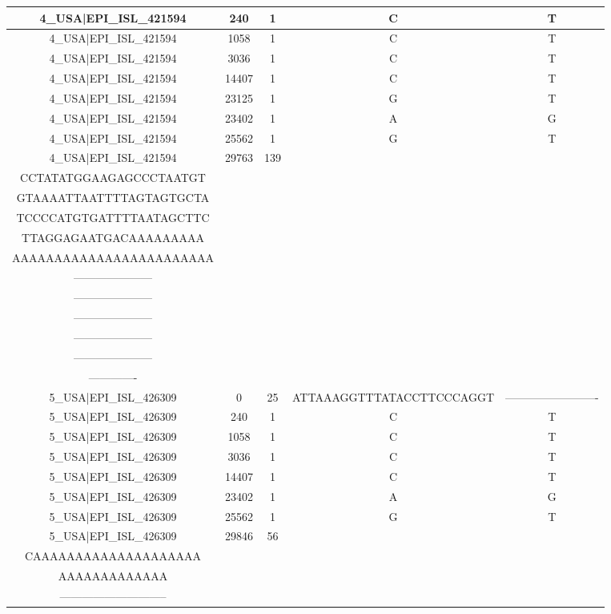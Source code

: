 \documentclass[a4paper,10pt]{article}
\begin{document}
\begin{longtable}{@{}ccccc@{}}
4\_USA|EPI\_ISL\_421594 & 240 & 1 & C & T \\* \midrule
4\_USA|EPI\_ISL\_421594 & 1058 & 1 & C & T \\* \midrule
4\_USA|EPI\_ISL\_421594 & 3036 & 1 & C & T \\* \midrule
4\_USA|EPI\_ISL\_421594 & 14407 & 1 & C & T \\* \midrule
4\_USA|EPI\_ISL\_421594 & 23125 & 1 & G & T \\* \midrule
4\_USA|EPI\_ISL\_421594 & 23402 & 1 & A & G \\* \midrule
4\_USA|EPI\_ISL\_421594 & 25562 & 1 & G & T \\* \midrule
4\_USA|EPI\_ISL\_421594 & 29763 & 139 & \begin{tabular}[c]{@{}c@{}}TGAACAATGCTAGGGAGAGCTG\\ CCTATATGGAAGAGCCCTAATGT\\ GTAAAATTAATTTTAGTAGTGCTA\\ TCCCCATGTGATTTTAATAGCTTC\\ TTAGGAGAATGACAAAAAAAAA\\ AAAAAAAAAAAAAAAAAAAAAAAA\end{tabular} & \begin{tabular}[c]{@{}c@{}}---------------------\\ ---------------------\\ ---------------------\\ ---------------------\\ ---------------------\\ ---------------------\\ -------------\end{tabular} \\* \midrule
5\_USA|EPI\_ISL\_426309 & 0 & 25 & ATTAAAGGTTTATACCTTCCCAGGT & ------------------------- \\* \midrule
5\_USA|EPI\_ISL\_426309 & 240 & 1 & C & T \\* \midrule
5\_USA|EPI\_ISL\_426309 & 1058 & 1 & C & T \\* \midrule
5\_USA|EPI\_ISL\_426309 & 3036 & 1 & C & T \\* \midrule
5\_USA|EPI\_ISL\_426309 & 14407 & 1 & C & T \\* \midrule
5\_USA|EPI\_ISL\_426309 & 23402 & 1 & A & G \\* \midrule
5\_USA|EPI\_ISL\_426309 & 25562 & 1 & G & T \\* \midrule
5\_USA|EPI\_ISL\_426309 & 29846 & 56 & \begin{tabular}[c]{@{}c@{}}TAATAGCTTCTTAGGAGAATGA\\ CAAAAAAAAAAAAAAAAAAAA\\ AAAAAAAAAAAAA\end{tabular} & \begin{tabular}[c]{@{}c@{}}---------------------------\\ -----------------------------\end{tabular} \\* \midrule

\end{longtable}
\end{document}
